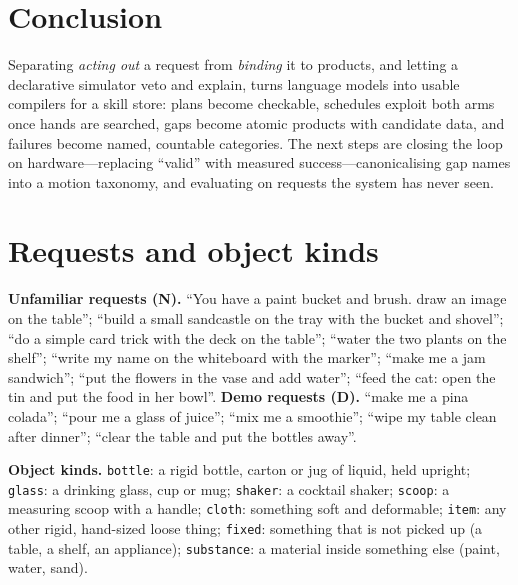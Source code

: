 \documentclass[10pt,twocolumn,letterpaper]{article}
\newcommand{\code}[1]{\texttt{\small #1}}
\begin{document}
\section{Conclusion}
Separating \emph{acting out} a request from \emph{binding} it to products, and
letting a declarative simulator veto and explain, turns language models into
usable compilers for a skill store: plans become checkable, schedules exploit both
arms once hands are searched, gaps become atomic products with candidate data, and
failures become named, countable categories. The next steps are closing the loop on
hardware---replacing ``valid'' with measured success---canonicalising gap names into
a motion taxonomy, and evaluating on requests the system has never seen.

{\small


}

\appendix
\section{Requests and object kinds}\label{app:requests}
\textbf{Unfamiliar requests (N).} ``You have a paint bucket and brush. draw an image
on the table''; ``build a small sandcastle on the tray with the bucket and shovel'';
``do a simple card trick with the deck on the table''; ``water the two plants on the
shelf''; ``write my name on the whiteboard with the marker''; ``make me a jam
sandwich''; ``put the flowers in the vase and add water''; ``feed the cat: open the
tin and put the food in her bowl''. \textbf{Demo requests (D).} ``make me a pina
colada''; ``pour me a glass of juice''; ``mix me a smoothie''; ``wipe my table clean
after dinner''; ``clear the table and put the bottles away''.

\textbf{Object kinds.} \code{bottle}: a rigid bottle, carton or jug of liquid, held
upright; \code{glass}: a drinking glass, cup or mug; \code{shaker}: a cocktail
shaker; \code{scoop}: a measuring scoop with a handle; \code{cloth}: something soft
and deformable; \code{item}: any other rigid, hand-sized loose thing; \code{fixed}:
something that is not picked up (a table, a shelf, an appliance); \code{substance}:
a material inside something else (paint, water, sand).
\end{document}
